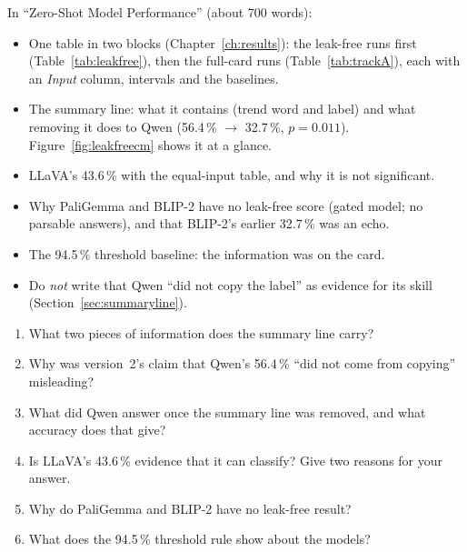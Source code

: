 \begin{foryourreport}
In ``Zero-Shot Model Performance'' (about 700 words):
\begin{itemize}
  \item One table in two blocks (Chapter~\ref{ch:results}): the leak-free runs first (Table~\ref{tab:leakfree}), then the full-card runs (Table~\ref{tab:trackA}), each with an \emph{Input} column, intervals and the baselines.
  \item The summary line: what it contains (trend word and label) and what removing it does to Qwen (56.4\,\% $\rightarrow$ 32.7\,\%, $p = 0.011$). Figure~\ref{fig:leakfreecm} shows it at a glance.
  \item LLaVA's 43.6\,\% with the equal-input table, and why it is not significant.
  \item Why PaliGemma and BLIP-2 have no leak-free score (gated model; no parsable answers), and that BLIP-2's earlier 32.7\,\% was an echo.
  \item The 94.5\,\% threshold baseline: the information was on the card.
  \item Do \emph{not} write that Qwen ``did not copy the label'' as evidence for its skill (Section~\ref{sec:summaryline}).
\end{itemize}
\end{foryourreport}

\begin{selfcheck}
\begin{enumerate}
  \item What two pieces of information does the summary line carry?
  \item Why was version~2's claim that Qwen's 56.4\,\% ``did not come from copying'' misleading?
  \item What did Qwen answer once the summary line was removed, and what accuracy does that give?
  \item Is LLaVA's 43.6\,\% evidence that it can classify? Give two reasons for your answer.
  \item Why do PaliGemma and BLIP-2 have no leak-free result?
  \item What does the 94.5\,\% threshold rule show about the models?
\end{enumerate}
\end{selfcheck}

